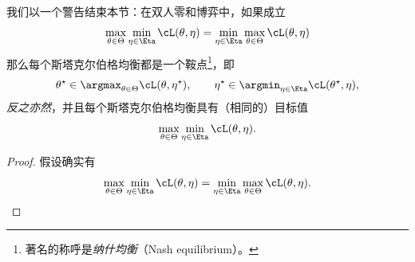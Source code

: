 \documentclass[../../book-main_zh.tex]{subfiles}
\begin{document}
我们以一个警告结束本节：在双人零和博弈中，如果成立
\begin{equation}
    \max_{\theta \in \Theta}\min_{\eta \in \Eta}\cL(\theta, \eta) =
    \min_{\eta \in \Eta}\max_{\theta \in \Theta}\cL(\theta, \eta)
\end{equation}
那么每个斯塔克尔伯格均衡都是一个鞍点\footnote{著名的称呼是\textit{纳什均衡}（Nash equilibrium）。}，即
\begin{equation}
    \theta^{\star} \in \argmax_{\theta \in \Theta}\cL(\theta,
    \eta^{\star}), \qquad \eta^{\star} \in \argmin_{\eta \in
    \Eta}\cL(\theta^{\star}, \eta),
\end{equation}
\textit{反之亦然}，并且每个斯塔克尔伯格均衡具有（相同的）目标值 \[\max_{\theta \in \Theta}\min_{\eta
\in \Eta}\cL(\theta, \eta).\]
\begin{proof} %
    假设确实有
    \begin{equation}
        \max_{\theta \in \Theta}\min_{\eta \in \Eta}\cL(\theta, \eta)
        = \min_{\eta \in \Eta}\max_{\theta  \in \Theta}\cL(\theta, \eta).
    \end{equation}


\end{proof}
\end{document}
